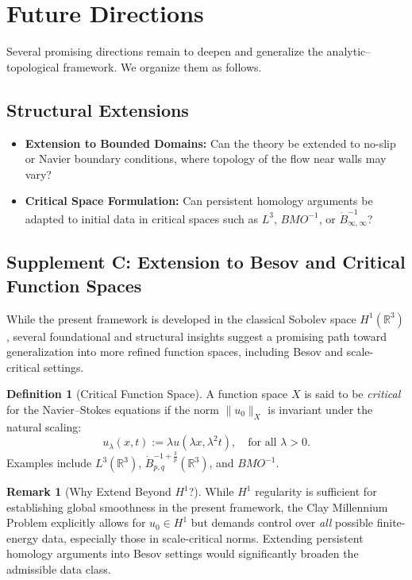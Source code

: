 \documentclass[11pt]{article}
\theoremstyle{definition}
\newtheorem{definition}[theorem]{Definition}
\newtheorem{remark}[theorem]{Remark}
\begin{document}
\section{Future Directions}
\label{sec:future}
Several promising directions remain to deepen and generalize the analytic–topological framework. We organize them as follows.

\subsection*{Structural Extensions}
\begin{itemize}
  \item \textbf{Extension to Bounded Domains:} Can the theory be extended to no-slip or Navier boundary conditions, where topology of the flow near walls may vary?
  \item \textbf{Critical Space Formulation:} Can persistent homology arguments be adapted to initial data in critical spaces such as $L^3$, $BMO^{-1}$, or $\dot{B}^{-1}_{\infty,\infty}$?
\end{itemize}

\subsection*{Supplement C: Extension to Besov and Critical Function Spaces}

While the present framework is developed in the classical Sobolev space $H^1(\mathbb{R}^3)$, several foundational and structural insights suggest a promising path toward generalization into more refined function spaces, including Besov and scale-critical settings.

\begin{definition}[Critical Function Space]
A function space $X$ is said to be \emph{critical} for the Navier–Stokes equations if the norm $\|u_0\|_X$ is invariant under the natural scaling:
\[
u_\lambda(x, t) := \lambda u(\lambda x, \lambda^2 t), \quad \text{for all } \lambda > 0.
\]
Examples include $L^3(\mathbb{R}^3)$, $\dot{B}^{-1+\frac{3}{p}}_{p,q}(\mathbb{R}^3)$, and $BMO^{-1}$.
\end{definition}

\begin{remark}[Why Extend Beyond $H^1$?]
While $H^1$ regularity is sufficient for establishing global smoothness in the present framework, the Clay Millennium Problem explicitly allows for $u_0 \in H^1$ but demands control over \emph{all} possible finite-energy data, especially those in scale-critical norms. Extending persistent homology arguments into Besov settings would significantly broaden the admissible data class.
\end{remark}
\end{document}
